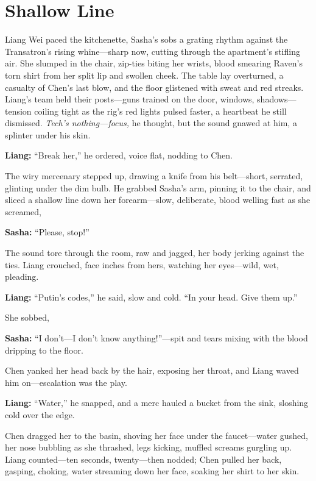 \documentclass[12pt]{book}
\begin{document}
\section{Shallow Line}

Liang Wei paced the kitchenette, Sasha’s sobs a grating rhythm against the Transatron’s rising whine—sharp now, cutting through the apartment’s stifling air. She slumped in the chair, zip-ties biting her wrists, blood smearing Raven’s torn shirt from her split lip and swollen cheek. The table lay overturned, a casualty of Chen’s last blow, and the floor glistened with sweat and red streaks. Liang’s team held their posts—guns trained on the door, windows, shadows—tension coiling tight as the rig’s red lights pulsed faster, a heartbeat he still dismissed. \emph{Tech’s nothing—focus,} he thought, but the sound gnawed at him, a splinter under his skin.

\vspace{0.5em}
\textbf{Liang:} “Break her,” he ordered, voice flat, nodding to Chen.

The wiry mercenary stepped up, drawing a knife from his belt—short, serrated, glinting under the dim bulb. He grabbed Sasha’s arm, pinning it to the chair, and sliced a shallow line down her forearm—slow, deliberate, blood welling fast as she screamed, 

\vspace{0.5em}
\textbf{Sasha:} “Please, stop!”

The sound tore through the room, raw and jagged, her body jerking against the ties. Liang crouched, face inches from hers, watching her eyes—wild, wet, pleading. 

\vspace{0.5em}
\textbf{Liang:} “Putin’s codes,” he said, slow and cold. “In your head. Give them up.”

She sobbed, 

\vspace{0.5em}
\textbf{Sasha:} “I don’t—I don’t know anything!”—spit and tears mixing with the blood dripping to the floor.

Chen yanked her head back by the hair, exposing her throat, and Liang waved him on—escalation was the play. 

\vspace{0.5em}
\textbf{Liang:} “Water,” he snapped, and a merc hauled a bucket from the sink, sloshing cold over the edge.

Chen dragged her to the basin, shoving her face under the faucet—water gushed, her nose bubbling as she thrashed, legs kicking, muffled screams gurgling up. Liang counted—ten seconds, twenty—then nodded; Chen pulled her back, gasping, choking, water streaming down her face, soaking her shirt to her skin. 
\end{document}
